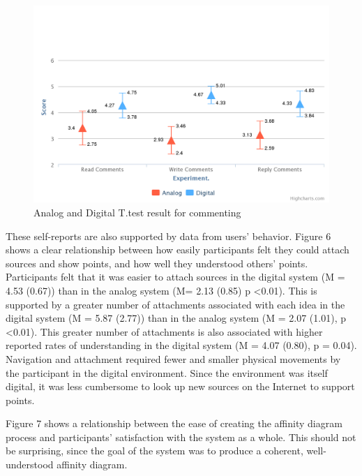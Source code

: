 \documentclass{sigchi}
\begin{document}
\begin{figure}[!h]
\centering
\includegraphics[width=1.0\columnwidth]{comments}
\caption{Analog and Digital T.test result for commenting}
\label{fig:figure1}
\end{figure}

These self-reports are also supported by data from users' behavior.  Figure 6 shows a clear relationship between how easily participants felt they could attach sources and show points, and how well they understood others' points. Participants felt that it was easier to attach sources in the digital system (M = 4.53 (0.67)) than in the analog system (M= 2.13 (0.85)  p \textless 0.01). This is supported by a greater number of attachments associated with each idea in the digital system (M = 5.87 (2.77)) than in the analog system (M = 2.07 (1.01), p \textless 0.01). This greater number of attachments is also associated with higher reported rates of understanding in the digital system (M = 4.07 (0.80), p = 0.04). Navigation and attachment required fewer and smaller physical movements by the participant in the digital environment. Since the environment was itself digital, it was less cumbersome to look up new sources on the Internet to support points. 

Figure 7 shows a relationship between the ease of creating the affinity diagram process and participants' satisfaction with the system as a whole. This should not be surprising, since the goal of the system was to produce a coherent, well-understood affinity diagram.
\end{document}
